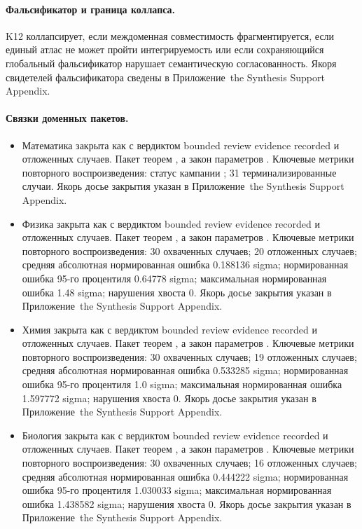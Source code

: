 \paragraph{Фальсификатор и граница коллапса.}
K12 коллапсирует, если междоменная совместимость фрагментируется, если единый атлас не может пройти интегрируемость или если сохраняющийся глобальный фальсификатор нарушает семантическую согласованность.
Якоря свидетелей фальсификатора сведены в Приложение~the Synthesis Support Appendix.

\paragraph{Связки доменных пакетов.}
\begin{itemize}[leftmargin=1.6em,nosep]
\item Математика закрыта как  с вердиктом bounded review evidence recorded и  отложенных случаев. Пакет теорем , а закон параметров . Ключевые метрики повторного воспроизведения: статус кампании ; 31 терминализированные случаи. Якорь досье закрытия указан в Приложение~the Synthesis Support Appendix.
\item Физика закрыта как  с вердиктом bounded review evidence recorded и  отложенных случаев. Пакет теорем , а закон параметров . Ключевые метрики повторного воспроизведения: 30 охваченных случаев; 20 отложенных случаев; средняя абсолютная нормированная ошибка 0.188136 sigma; нормированная ошибка 95-го процентиля 0.64778 sigma; максимальная нормированная ошибка 1.48 sigma; нарушения хвоста 0. Якорь досье закрытия указан в Приложение~the Synthesis Support Appendix.
\item Химия закрыта как  с вердиктом bounded review evidence recorded и  отложенных случаев. Пакет теорем , а закон параметров . Ключевые метрики повторного воспроизведения: 30 охваченных случаев; 19 отложенных случаев; средняя абсолютная нормированная ошибка 0.533285 sigma; нормированная ошибка 95-го процентиля 1.0 sigma; максимальная нормированная ошибка 1.597772 sigma; нарушения хвоста 0. Якорь досье закрытия указан в Приложение~the Synthesis Support Appendix.
\item Биология закрыта как  с вердиктом bounded review evidence recorded и  отложенных случаев. Пакет теорем , а закон параметров . Ключевые метрики повторного воспроизведения: 30 охваченных случаев; 16 отложенных случаев; средняя абсолютная нормированная ошибка 0.444222 sigma; нормированная ошибка 95-го процентиля 1.030033 sigma; максимальная нормированная ошибка 1.438582 sigma; нарушения хвоста 0. Якорь досье закрытия указан в Приложение~the Synthesis Support Appendix.

\end{itemize}
